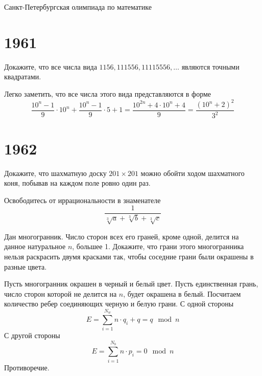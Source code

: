 \documentclass[11pt, a4paper]{template}
\begin{document}
\begin{titlepage}
  \begin{center}
	\Huge{Санкт-Петербургская олимпиада по математике}
  \end{center}
\end{titlepage}

\chapter{1961}

\begin{exercise}
Докажите, что все числа вида $1156, 111556, 11115556, \dots$ являются точными квадратами.
\end{exercise}

\begin{solution}
Легко заметить, что все числа этого вида представляются в форме
$$
\frac{10^{n}-1}{9} \cdot 10^{n} + \frac{10^{n} - 1}{9} \cdot 5 + 1 = \frac{10^{2n} + 4 \cdot 10^{n} + 4}{9} = \frac{(10^{n} + 2)^{2}}{3^{2}}
$$
\end{solution}

\chapter{1962}

\begin{exercise}
Докажите, что шахматную доску $201 \times 201$ можно обойти ходом шахматного коня, побывав на каждом поле ровно один раз.
\end{exercise}

\begin{exercise}
Освободитесь от иррациональности в знаменателе
$$
\frac{1}{\sqrt[3]{a} + \sqrt[3]{b} + \sqrt[3]{c}}
$$
\end{exercise}

\begin{exercise}
Дан многогранник. Число сторон всех его граней, кроме одной, делится на данное натуральное $n$, большее 1. Докажите, что грани этого многогранника нельзя раскрасить двумя красками так, чтобы соседние грани были окрашены в разные цвета.
\end{exercise}

\begin{solution}
Пусть многогранник окрашен в черный и белый цвет. Пусть единственная грань, число сторон которой не делится на $n$, будет окрашена в белый. Посчитаем количество ребер соединяющих черную и белую грани. С одной стороны
$$
E = \sum_{i = 1}^{N_{w}} n\cdot q_{i} + q = q \mod n
$$
С другой стороны
$$
E = \sum_{i = 1}^{N_{b}} n\cdot p_{i} = 0 \mod n
$$
Противоречие.
\end{solution}
\end{document}
